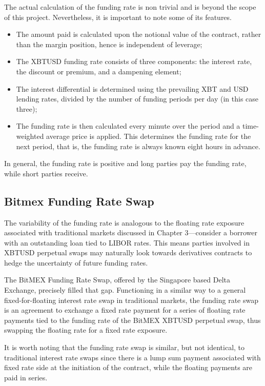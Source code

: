 The actual calculation of the funding rate is non trivial and is beyond the scope of this project. Nevertheless, it is important to note some of its features.

\begin{itemize}
    \item The amount paid is calculated upon the notional value of the contract, rather than the margin position, hence is independent of leverage;
    \item The XBTUSD funding rate consists of three components: the interest rate, the discount or premium, and a dampening element;
    \item The interest differential is determined using the prevailing XBT and USD lending rates, divided by the number of funding periods per day (in this case three);
    \item The funding rate is then calculated every minute over the period and a time-weighted average price is applied. This determines the funding rate for the next period, that is, the funding rate is always known eight hours in advance.
\end{itemize}
In general, the funding rate is positive and long parties pay the funding rate, while short parties receive.

\subsection{Bitmex Funding Rate Swap}
The variability of the funding rate is analogous to the floating rate exposure associated with traditional markets discussed in Chapter 3––consider a borrower with an outstanding loan tied to LIBOR rates. This means parties involved in XBTUSD perpetual swaps may naturally look towards derivatives contracts to hedge the uncertainty of future funding rates.

The BitMEX Funding Rate Swap, offered by the Singapore based Delta Exchange, precisely filled that gap. Functioning in a similar way to a general fixed-for-floating interest rate swap in traditional markets, the funding rate swap is an agreement to exchange a fixed rate payment for a series of floating rate payments tied to the funding rate of the BitMEX XBTUSD perpetual swap, thus swapping the floating rate for a fixed rate exposure. 

It is worth noting that the funding rate swap is similar, but not identical, to traditional interest rate swaps since there is a lump sum payment associated with fixed rate side at the initiation of the contract, while the floating payments are paid in series. 

